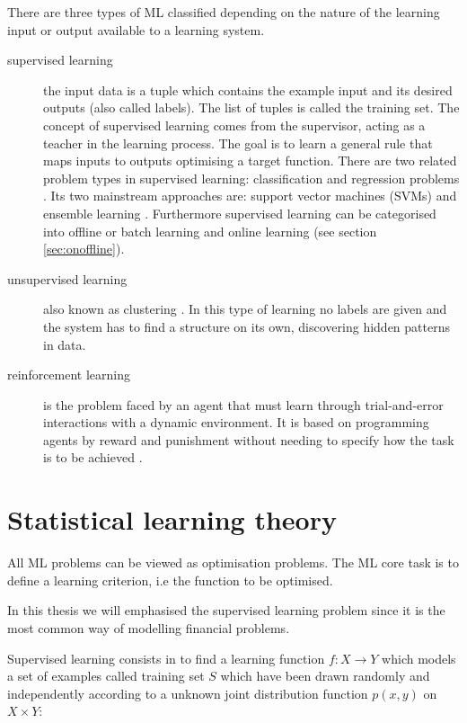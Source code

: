 There are three types of ML classified depending on the nature of the learning input or output available to a learning system.
\begin{description}
\item[supervised learning]  the input data is a tuple which contains the example input and its desired outputs (also called labels). The list of tuples is called the training set. The concept of supervised learning comes from the supervisor, acting as a teacher in the learning process. The goal is to learn a general rule that maps inputs to outputs optimising a target function. There are two related problem types in supervised learning: classification and regression problems \cite{bishop2006}. Its two mainstream approaches are: support vector machines (SVMs) \cite{vapnik1998} and ensemble learning \cite{breiman1998}. Furthermore supervised learning can be categorised into offline or batch learning and online learning (see section \ref{sec:onoffline}). 
\item[unsupervised learning] also known as clustering \cite{ben2005}. In this type of learning no labels are given and the system has to find a structure on its own, discovering hidden patterns in data.
\item[reinforcement learning] is the problem faced by an agent that must learn 
through trial-and-error interactions with a dynamic environment. It is based on programming agents by reward and punishment without needing to specify how the task is to be achieved \cite{sutton1998}.
\end{description}





\section{Statistical learning theory} \label{sec:mltheory}

All ML problems can be viewed as optimisation problems. The ML core task is to define a learning criterion, i.e the function to be optimised. 

In this thesis we will emphasised the supervised learning problem since it is the most common way of modelling financial problems.

Supervised learning consists in to find a learning function $f: X \rightarrow Y$ which models a set of examples called training set $S$ which have been drawn randomly and independently according to a unknown joint distribution function $p(x,y)$ on $X \times Y$:


